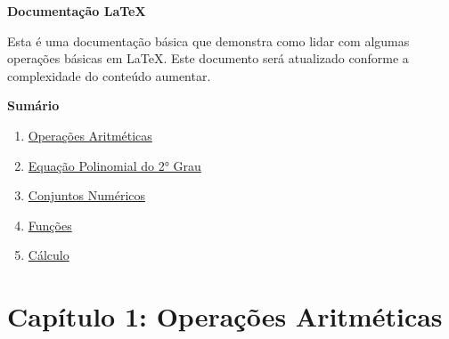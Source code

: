 \documentclass[a4paper, 12pt]{article}
\begin{document}
\begin{titlepage}
    \begin{center}
        \vspace*{1cm}
        
        \textbf{\LARGE Documentação \LaTeX}
        
        \vspace{0.5cm}
        
        Esta é uma documentação básica que demonstra como lidar com algumas operações básicas em \LaTeX. Este documento será atualizado conforme a complexidade do conteúdo aumentar.
        
        \vfill
        
        \hrulefill
        
        \vfill
        
        \textbf{\large Sumário}
        
        \begin{enumerate}
            \item \underline{Operações Aritméticas}
            \item \underline{Equação Polinomial do 2° Grau}
            \item \underline{Conjuntos Numéricos}
            \item \underline{Funções}
            \item \underline{Cálculo}
        \end{enumerate}
        
        \vfill
        
        \hrulefill
        
    \end{center}
\end{titlepage}

\newpage

\section*{Capítulo 1: Operações Aritméticas}
\end{document}
